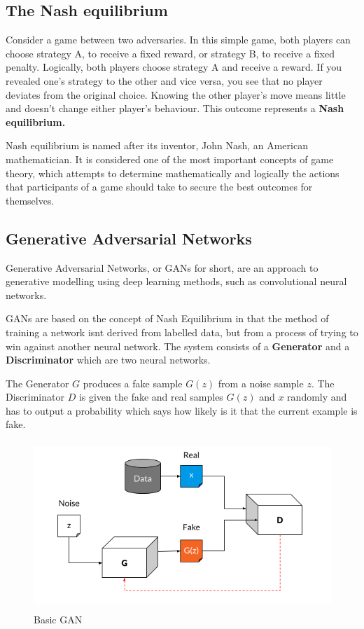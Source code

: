 \documentclass[a4paper]{article}
\begin{document}
    \subsection{The Nash equilibrium}
    Consider a game between two adversaries. In this simple game, both players can choose strategy A, 
    to receive a fixed reward, or strategy B, to receive a fixed penalty. 
    Logically, both players choose strategy A and receive a reward. If you revealed one's strategy 
    to the other and vice versa, you see that no player deviates from the original choice. Knowing the other player's move means little 
    and doesn't change either player's behaviour. This outcome represents a {\bfseries Nash equilibrium.}

    Nash equilibrium is named after its inventor, John Nash, an American mathematician. 
    It is considered one of the most important concepts of game theory, which attempts to 
    determine mathematically and logically the actions that participants of a game should 
    take to secure the best outcomes for themselves. 

    \subsection{Generative Adversarial Networks}
    Generative Adversarial Networks, or GANs for short, are an approach to generative modelling 
    using deep learning methods, such as convolutional neural networks.

    GANs are based on the concept of Nash Equilibrium in that the method of training a network
    isnt derived from labelled data, but from a process of trying to win against another neural
    network. The system consists of a {\bfseries Generator} and a {\bfseries Discriminator} which
    are two neural networks.

    The Generator $G$ produces a fake sample $G(z)$ from a noise sample $z$.
    The Discriminator $D$ is given the fake and real samples $G(z)$ and $x$ randomly and has to
    output a probability which says how likely is it that the current example is fake.

    \begin{figure}[H]
      \centering
      \includegraphics[height=2.5in]{../ref/basicgan.png}
      \caption{Basic GAN}
      \label{fig:basicgan}
    \end{figure}
\end{document}
